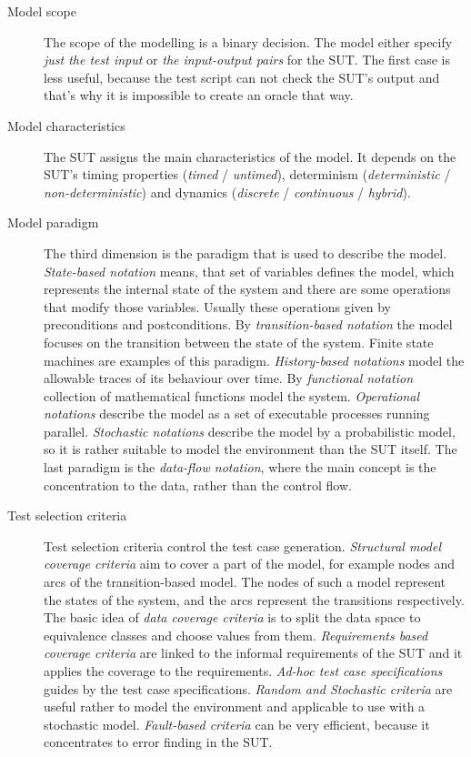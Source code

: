 \begin{description}
	\item[Model scope] The scope of the modelling is a binary decision. The model either specify \textit{just the test input} or \textit{the input-output pairs} for the SUT. The first case is less useful, because the test script can not check the SUT's output and that's why it is impossible to create an oracle that way.
	
	\item[Model characteristics] The SUT assigns the main characteristics of the model. It depends on the SUT's timing properties (\textit{timed} / \textit{untimed}), determinism (\textit{deterministic} / \textit{non-deterministic}) and dynamics (\textit{discrete} / \textit{continuous} / \textit{hybrid}).
	
	\item[Model paradigm] The third dimension is the paradigm that is used to describe the model. \textit{State-based notation} means, that set of variables defines the model, which represents the internal state of the system and there are some operations that modify those variables. Usually these operations given by preconditions and postconditions. By \textit{transition-based notation} the model focuses on the transition between the state of the system. Finite state machines are examples of this paradigm. \textit{History-based notations} model the allowable traces of its behaviour over time. By \textit{functional notation} collection of mathematical functions model the system. \textit{Operational notations} describe the model as a set of executable processes running parallel. \textit{Stochastic notations} describe the model by a probabilistic model, so it is rather suitable to model the environment than the SUT itself. The last paradigm is the \textit{data-flow notation}, where the main concept is the concentration to the data, rather than the control flow.
	
	\item[Test selection criteria] Test selection criteria control the test case generation. \textit{Structural model coverage criteria} aim to cover a part of the model, for example nodes and arcs of the transition-based model. The nodes of such a model represent the states of the system, and the arcs represent the transitions respectively. The basic idea of \textit{data coverage criteria} is to split the data space to equivalence classes and choose values from them. \textit{Requirements based coverage criteria} are linked to the informal requirements of the SUT and it applies the coverage to the requirements. \textit{Ad-hoc test case specifications} guides by the test case specifications. \textit{Random and Stochastic criteria} are useful rather to model the environment and applicable to use with a stochastic model. \textit{Fault-based criteria} can be very efficient, because it concentrates to error finding in the SUT.
	

\end{description}
